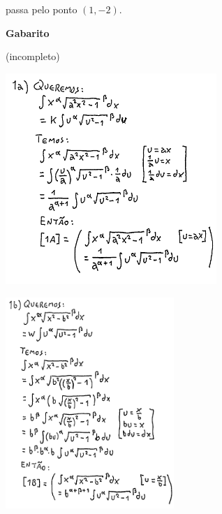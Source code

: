 \documentclass[oneside,12pt]{article}
\begin{document}
passa pelo ponto $(1,-2)$.




\newpage

\thispagestyle{empty}

\begin{center}

\vspace*{2.0cm}

{\bf \Large Gabarito}

(incompleto)

\end{center}


\newpage



\includegraphics[height=8cm]{2020-2-C2/20210502_C2_P2_1a.pdf}

\includegraphics[height=8cm]{2020-2-C2/20210502_C2_P2_1b.pdf}
\end{document}
